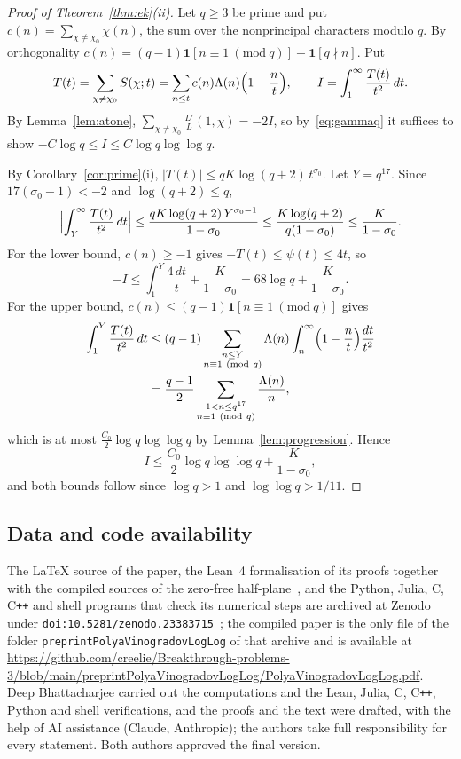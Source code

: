 \documentclass[12pt]{amsart}
\numberwithin{equation}{section}
\newcommand{\zenodoID}{10.5281/zenodo.23383715}
\newcommand{\preprintURL}{https://github.com/creelie/Breakthrough-problems-3/blob/main/preprintPolyaVinogradovLogLog/PolyaVinogradovLogLog.pdf}
\theoremstyle{definition}
\begin{document}
\begin{proof}[Proof of Theorem~\ref{thm:ek}(ii)]
Let $q\ge3$ be prime and put $c(n)=\sum_{\chi\ne\chi_0}\chi(n)$, the sum over the nonprincipal
characters modulo $q$. By orthogonality $c(n)=(q-1)\mathbf 1[n\equiv1\ (\mathrm{mod}\ q)]
-\mathbf 1[q\nmid n]$. Put
\[
  T(t)=\sum_{\chi\ne\chi_0}S(\chi;t)=\sum_{n\le t}c(n)\Lambda(n)\Bigl(1-\frac nt\Bigr),\qquad
  I=\int_1^\infty\frac{T(t)}{t^2}\,dt.
\]
By Lemma~\ref{lem:atone}, $\sum_{\chi\ne\chi_0}\frac{L'}{L}(1,\chi)=-2I$, so by~\eqref{eq:gammaq}
it suffices to show $-C\log q\le I\le C\log q\log\log q$.

By Corollary~\ref{cor:prime}(i), $|T(t)|\le qK\log(q+2)\,t^{\sigma_0}$. Let $Y=q^{17}$. Since
$17(\sigma_0-1)<-2$ and $\log(q+2)\le q$,
\[
  \Bigl|\int_Y^\infty\frac{T(t)}{t^2}\,dt\Bigr|\le\frac{qK\log(q+2)\,Y^{\sigma_0-1}}{1-\sigma_0}
  \le\frac{K\log(q+2)}{q(1-\sigma_0)}\le\frac K{1-\sigma_0}.
\]
For the lower bound, $c(n)\ge-1$ gives $-T(t)\le\psi(t)\le4t$, so
\[
  -I\le\int_1^Y\frac{4\,dt}t+\frac K{1-\sigma_0}=68\log q+\frac K{1-\sigma_0}.
\]
For the upper bound, $c(n)\le(q-1)\mathbf 1[n\equiv1\ (\mathrm{mod}\ q)]$ gives
\begin{align*}
  \int_1^Y\frac{T(t)}{t^2}\,dt&\le(q-1)\sum_{\substack{n\le Y\\n\equiv1\ (\mathrm{mod}\ q)}}
  \Lambda(n)\int_n^\infty\Bigl(1-\frac nt\Bigr)\frac{dt}{t^2}\\
  &=\frac{q-1}2\sum_{\substack{1<n\le q^{17}\\n\equiv1\ (\mathrm{mod}\ q)}}\frac{\Lambda(n)}n,
\end{align*}
which is at most $\frac{C_0}2\log q\log\log q$ by Lemma~\ref{lem:progression}. Hence
\[
  I\le\frac{C_0}2\log q\log\log q+\frac K{1-\sigma_0},
\]
and both bounds follow since $\log q>1$ and $\log\log q>1/11$.
\end{proof}

\subsection*{Data and code availability}
\begingroup\raggedright
The \LaTeX{} source of the paper, the Lean~4 formalisation of its proofs together with the
compiled sources of the zero-free half-plane~\cite{OAI26}, and the Python, Julia, C, C\texttt{++}
and shell programs that check its numerical steps are archived at Zenodo under
\href{https://doi.org/\zenodoID}{\nolinkurl{doi:\zenodoID}}~\cite{BB26code}; the compiled paper is
the only file of the folder \texttt{preprintPolyaVinogradovLogLog} of that archive and is
available at \url{\preprintURL}. Deep Bhattacharjee carried out the computations and the Lean,
Julia, C, C\texttt{++}, Python and shell verifications, and the proofs and the text were drafted,
with the help of AI assistance (Claude, Anthropic); the authors take full responsibility for every
statement. Both authors approved the final version.\par
\endgroup
\end{document}
